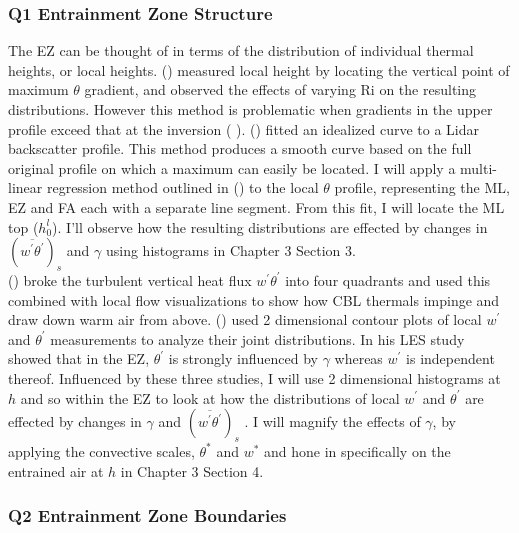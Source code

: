 \subsubsection{Q1 Entrainment Zone Structure}     
The \acs{EZ} can be thought of in terms of the distribution of individual thermal heights, or local heights. \citeauthor{SullMoengStev} (\citeyear{SullMoengStev}) measured local height by locating the vertical point of maximum $\theta$ gradient, and observed the effects of varying \acs{Ri} on the resulting distributions. However this method is problematic when gradients in the upper profile exceed that at the inversion (\citeauthor{BrooksFowler2} \citeyear{BrooksFowler2}).  \citeauthor{SteynBaldHoff} (\citeyear{SteynBaldHoff}) fitted an idealized curve to a Lidar backscatter profile.  This method produces a smooth curve based on the full original profile on which a maximum can easily be located.  I will apply a multi-linear regression method outlined in \citeauthor{Vieth} (\citeyear{Vieth}) to the local $\theta$ profile, representing the \acs{ML}, \acs{EZ} and \acs{FA} each with a separate line segment. From this fit, I will locate the \acs{ML} top ($h^{l}_{0}$).  I'll observe how the resulting distributions are effected by changes in $(\overline{w^{'}\theta^{'}})_{s}$ and $\gamma$ using histograms in Chapter 3 Section 3.\\

\citeauthor{SullMoengStev} (\citeyear{SullMoengStev}) broke the turbulent vertical heat flux $w^{'}\theta^{'}$ into four quadrants and used this combined with local flow visualizations to show how \acs{CBL} thermals impinge and draw down warm air from above. \citeauthor{MahrtPaum} (\citeyear{MahrtPaum}) used 2 dimensional contour plots of local $w^{'}$ and $\theta^{'}$ measurements to analyze their joint distributions.  In his \citeyear{Sorbjan} \acs{LES} study \citeauthor{Sorbjan} showed that in the \acs{EZ}, $\theta^{'}$ is strongly influenced by $\gamma$  whereas $w^{'}$ is independent thereof.  Influenced by these three studies, I will use 2 dimensional histograms at $h$ and so within the \acs{EZ} to look at how the distributions of local $w^{'}$ and $\theta^{'}$ are effected by changes in $\gamma$ and $(\overline{w^{'}\theta^{'}})_{s}$ .  I will magnify the effects of $\gamma$, by applying the convective scales, $\theta^{*}$ and $w^{*}$ and hone in specifically on the entrained air at $h$ in Chapter 3 Section 4.\\    

\subsubsection{Q2 Entrainment Zone Boundaries}
       
